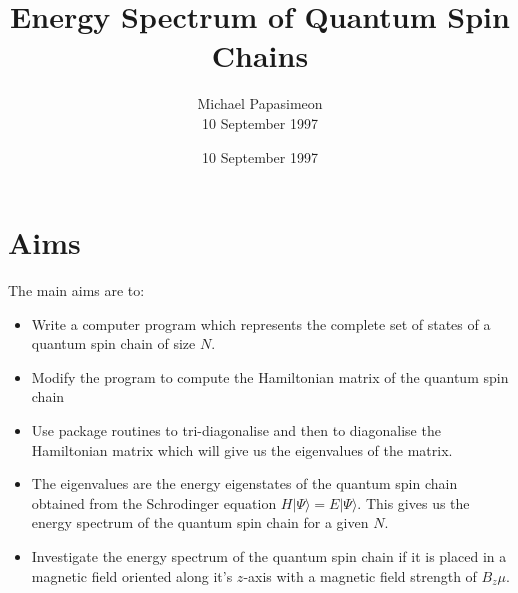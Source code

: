 \documentclass[a4paper]{IEEEtran}
\title{Energy Spectrum of Quantum Spin Chains}
\author{Michael Papasimeon\\ 10 September 1997} %
\date{10 September 1997}
\begin{document}
\maketitle

\section{Aims}
The main aims are to:
    \begin{itemize}
        \item Write a computer program which represents the complete set of states
              of a quantum spin chain of size $N$.
        \item Modify the program to compute the Hamiltonian matrix of the quantum spin chain
        \item Use package routines to tri-diagonalise and then to diagonalise the Hamiltonian
              matrix which will give us the eigenvalues of the matrix.
        \item The eigenvalues are the energy eigenstates of the quantum spin chain obtained
              from the Schrodinger equation $H|\Psi\rangle = E|\Psi\rangle$. This gives
              us the energy spectrum of the quantum spin chain for a given $N$.
        \item Investigate the energy spectrum of the quantum spin chain if it is placed
              in a magnetic field oriented along it's $z$-axis with a magnetic field
              strength of $B_z\mu$.
    \end{itemize}
\end{document}

